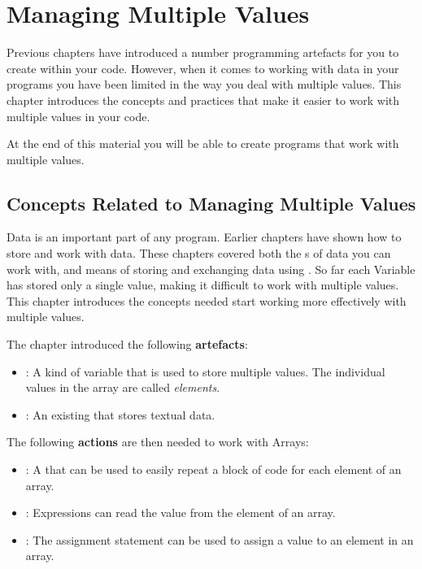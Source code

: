 \chapter{Managing Multiple Values} %
\label{cha:managing_multiple_values}

Previous chapters have introduced a number programming artefacts for you to create within your code. However, when it comes to working with data in your programs you have been limited in the way you deal with multiple values. This chapter introduces the concepts and practices that make it easier to work with multiple values in your code.

At the end of this material you will be able to create programs that work with multiple values. 

\minitoc

\clearpage
\section{Concepts Related to Managing Multiple Values} %
\label{sec:managing_multiple_values_concepts}

Data is an important part of any program. Earlier chapters have shown how to store and work with data. These chapters covered both the s of data you can work with, and means of storing and exchanging data using . So far each Variable has stored only a single value, making it difficult to work with multiple values. This chapter introduces the concepts needed start working more effectively with multiple values.

The chapter introduced the following \textbf{artefacts}:
\begin{itemize}
  \item {}: A kind of variable that is used to store multiple values. The individual values in the array are called \emph{elements}.
  \item {}: An existing  that stores textual data.
\end{itemize}

The following \textbf{actions} are then needed to work with Arrays:
\begin{itemize}
  \item {}: A  that can be used to easily repeat a block of code for each element of an array.
  \item {}: Expressions can read the value from the element of an array.
  \item {}: The assignment statement can be used to assign a value to an element in an array.
\end{itemize}

